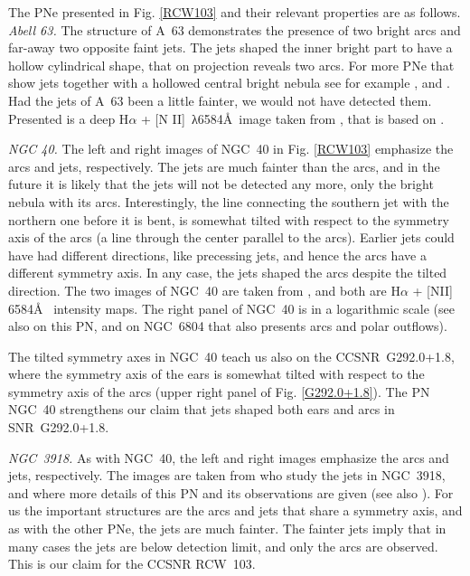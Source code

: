 \documentclass[12pt,preprint,a4paper]{aastex}
\begin{document}
The PNe presented in Fig. \ref{RCW103} and their relevant properties are as follows. 
\newline
\textit{Abell 63. } The structure of A~63 demonstrates the presence of two bright arcs and far-away two opposite faint jets. The jets shaped the inner bright part to have a hollow cylindrical shape, that on projection reveals two arcs. 
For more PNe that show jets together with a hollowed central bright nebula see for example \cite{GarciaDiazetal2012}, \cite{Clarketal2013} and \cite{Clyneetal2015}. 
Had the jets of A~63 been a little fainter, we would not have detected them. Presented is a deep H$\alpha$ + [N II]~λ6584\AA~image taken from \cite{Mitchelletal2007}, that is  based on \cite{PollaccoBell1997}.

\textit{NGC 40.} The left and right images of NGC~40 in Fig. \ref{RCW103} emphasize the arcs and jets, respectively. The jets are much fainter than the arcs, and in the future it is likely that the jets will not be detected any more, only the bright nebula with its arcs. Interestingly, the line connecting the southern jet with the northern one before it is bent, is somewhat tilted with respect to the symmetry axis of the arcs (a line through the center parallel to the arcs). Earlier jets could have had different directions, like precessing jets, and hence the arcs have a different symmetry axis. In any case, the jets shaped the arcs despite the tilted direction. 
The two images of NGC~40 are taken from \cite{Meaburnetal1996}, and both are H$\alpha$ + [NII] 6584\AA~ intensity maps.
The right panel of NGC~40 is in a logarithmic scale (see also  
\citealt{Balicketal1992} on this PN, and on NGC~6804 that also presents arcs and polar outflows).

The tilted symmetry axes in NGC~40 teach us also on the CCSNR~G292.0+1.8, where the symmetry axis of the ears is somewhat tilted with respect to the symmetry axis of the arcs (upper right panel of Fig. \ref{G292.0+1.8}). The PN NGC~40 strengthens our claim that jets shaped both ears and arcs in SNR~G292.0+1.8.

\textit{NGC~3918.} As with NGC~40, the left and right images emphasize the arcs and jets, respectively. The images are taken from \cite{Corradietal1999} who study the jets in NGC~3918, and where more details of this PN and its observations are given 
(see also \citealt{Corradietal2003}). For us the important structures are the arcs and jets that share a symmetry axis, and as with the other PNe, the jets are much fainter. The fainter jets imply that in many cases the jets are below detection limit, and only the arcs are observed. This is our claim for the CCSNR RCW~103.
\end{document}
